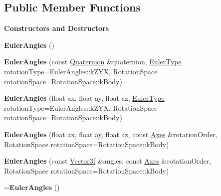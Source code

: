 \subsection*{Public Member Functions}
\begin{Indent}\textbf{ Constructors and Destructors}\par
\begin{DoxyCompactItemize}
\item 
\mbox{\label{classrev_1_1_euler_angles_a36714f7323d859028d1df740b7fd5bf5}} 
{\bfseries Euler\+Angles} ()
\item 
\mbox{\label{classrev_1_1_euler_angles_a4cad8ececb39a2062c0da3af11e75de7}} 
{\bfseries Euler\+Angles} (const \mbox{\hyperlink{classrev_1_1_quaternion}{Quaternion}} \&quaternion, \mbox{\hyperlink{classrev_1_1_euler_angles_a27302602f4b1e12892749e201df3d52d}{Euler\+Type}} rotation\+Type=Euler\+Angles\+::k\+Z\+YX, Rotation\+Space rotation\+Space=Rotation\+Space\+::k\+Body)
\item 
\mbox{\label{classrev_1_1_euler_angles_a56512b078ea7f6917b3e5b38e927b209}} 
{\bfseries Euler\+Angles} (float ax, float ay, float az, \mbox{\hyperlink{classrev_1_1_euler_angles_a27302602f4b1e12892749e201df3d52d}{Euler\+Type}} rotation\+Type=Euler\+Angles\+::k\+Z\+YX, Rotation\+Space rotation\+Space=Rotation\+Space\+::k\+Body)
\item 
\mbox{\label{classrev_1_1_euler_angles_adee51e702fde0c9b9a6224bfd106e30c}} 
{\bfseries Euler\+Angles} (float ax, float ay, float az, const \mbox{\hyperlink{classrev_1_1_vector}{Axes}} \&rotation\+Order, Rotation\+Space rotation\+Space=Rotation\+Space\+::k\+Body)
\item 
\mbox{\label{classrev_1_1_euler_angles_a50a758642ddf491fe031dc4e4aefb3c1}} 
{\bfseries Euler\+Angles} (const \mbox{\hyperlink{classrev_1_1_vector}{Vector3f}} \&angles, const \mbox{\hyperlink{classrev_1_1_vector}{Axes}} \&rotation\+Order, Rotation\+Space rotation\+Space=Rotation\+Space\+::k\+Body)
\item 
\mbox{\label{classrev_1_1_euler_angles_a6151e7b10c715df1b3dad85109f73485}} 
{\bfseries $\sim$\+Euler\+Angles} ()
\end{DoxyCompactItemize}
\end{Indent}
